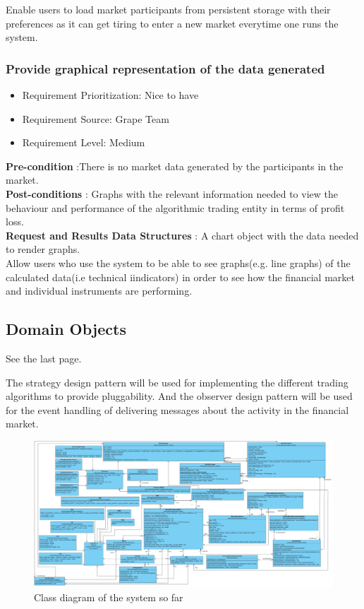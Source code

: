 \documentclass[12pt]{article}
\begin{document}
			Enable users to load market participants from persistent storage with their preferences as it can get tiring to enter a new market everytime one runs the system. 
			
			\subsubsection{Provide graphical representation of the data generated}
			\begin{itemize}
				\item Requirement Prioritization: Nice to have
				\item Requirement Source: Grape Team 
				\item Requirement Level: Medium	
			\end{itemize}
			\textbf{Pre-condition} :There is no market data generated by the participants in the market.\\
			\textbf{Post-conditions} : Graphs with the relevant information needed to view the behaviour and performance of the algorithmic trading entity in terms of profit loss.\\ 
			\textbf{Request and Results Data Structures} : A chart object with the data needed to render graphs.\\
						
			Allow users who use the system to be able to see graphs(e.g. line graphs) of the calculated data(i.e technical iindicators) in order to see how the financial market and individual instruments are performing.
					  
		\subsection{Domain Objects}	
		See the last page.
								
			The strategy design pattern will be used for implementing the different trading algorithms to provide pluggability.
			And the observer design pattern will be used for the event handling of delivering messages about the activity in the financial market.
		\clearpage 
		\newpage	
			\begin{figure}[th]
			\centering
			\vbox{\vspace{-5em}\includegraphics[scale=0.35, angle=90]{./ClassDiagram.jpg}}	
			\caption{Class diagram of the system so far}
			\label{domain objects}
			\end{figure}
		
\end{document}
